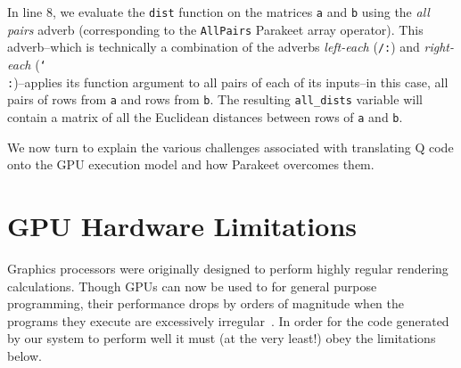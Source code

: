 \documentclass[preprint]{sigplanconf}
\begin{document}
In line 8, we evaluate the \texttt{dist} function on the matrices \texttt{a} and
\texttt{b} using the {\it all pairs} adverb (corresponding to the
\texttt{AllPairs} Parakeet array operator).  This adverb--which is technically
a combination of the adverbs \emph{left-each} (\texttt{/:}) and
\emph{right-each} (\texttt{\char`\\:})--applies its function argument to all
pairs of each of its inputs--in this case, all pairs of rows from \texttt{a} and
rows from \texttt{b}.  The resulting \texttt{all\_dists} variable will contain a
matrix of all the Euclidean distances between rows of \texttt{a} and \texttt{b}.

We now turn to explain the various challenges associated with translating Q code onto 
the GPU execution model and how Parakeet overcomes them.\\

\section{GPU Hardware Limitations}
Graphics processors were originally designed to perform highly regular rendering calculations. 
Though GPUs can now be used to for general purpose programming, their performance drops
by orders of magnitude when the programs they execute are excessively irregular~\cite{NvidCU}. 
In order for the code generated by our system to perform well it must (at the very least!) obey the limitations below. 
\end{document}
